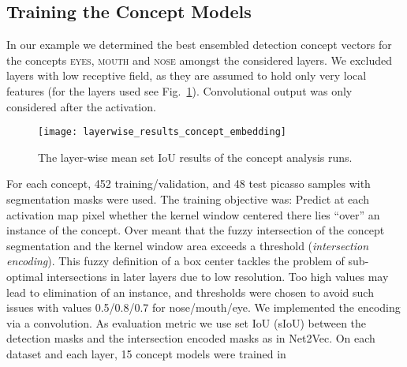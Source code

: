 \subsection{Training the Concept Models}
In our example we determined the best ensembled detection concept vectors for
the concepts \textsc{eyes}, \textsc{mouth} and \textsc{nose} amongst the
considered layers.
% 
We excluded layers with low receptive field, as they are assumed to
hold only very local features
(for the layers used see Fig.~\ref{fig:layerwiseresults}).
Convolutional output was only considered after the activation.
% 
\begin{figure}%
  \centering%
  \hspace*{-0.08\textwidth}\texttt{[image: layerwise\_results\_concept\_embedding]}
  \caption{The layer-wise mean set IoU results of the concept analysis runs.}
  \label{fig:layerwiseresults}
\end{figure}
% 
For each concept, 452 training/validation, and 48 test picasso samples
with segmentation masks were used.
The training objective was: Predict at each activation map pixel
whether the kernel window centered there lies \enquote{over}
an instance of the concept. Over meant that the fuzzy intersection of
the concept segmentation and the kernel window area exceeds a threshold
(\emph{intersection encoding}).
This fuzzy definition of a box center
tackles the problem of sub-optimal intersections in later layers
due to low resolution.
Too high values may lead to elimination of an instance,
and thresholds were chosen to avoid such issues with
values 0.5/0.8/0.7 for nose/mouth/eye.
We implemented the encoding via a convolution.
As evaluation metric we use set IoU (sIoU) between the detection
masks and the intersection encoded masks as in Net2Vec.
% 
On each dataset and each layer, 15 concept models were trained in
